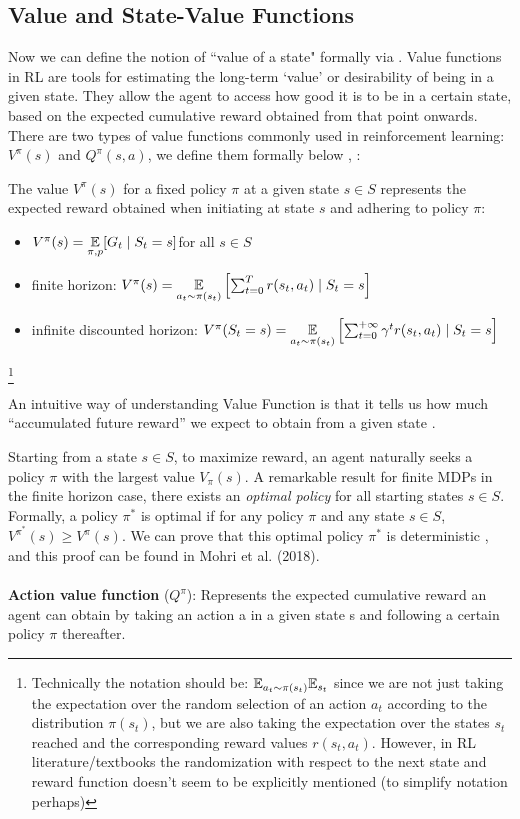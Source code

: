 \subsection{Value and State-Value Functions}

Now we can define the notion of ``value of a state" formally via . Value functions in RL are tools for estimating the long-term `value' or desirability of being in a given state. They allow the agent to access how good it is to be in a certain state, based on the expected cumulative reward obtained from that point onwards. There are two types of value functions commonly used in reinforcement learning: $V^{\pi}(s)$ and $Q^{\pi}(s,a)$, we define them formally below \cite{RL}, \cite{mohri2018}:
\begin{definition}
    The value $V^{\pi}(s)$ for a fixed policy $\pi$ at a given state $s \in S$ represents the expected reward obtained when initiating at state $s$ and adhering to policy $\pi:$
    \begin{itemize}
        \item $V^{\pi}(s) = \underset{\pi, p}{\mathbb E} [G_t \mid S_t = s]$for all $s \in S$ \cite{RL}
        \item finite horizon: $V^{\pi}(s) = \underset{a_t \sim \pi(s_t)}{\mathbb E} \left[ \sum_{t=0}^T r(s_t,a_t) \mid S_t =s
        \right]$ \cite{mohri2018}
        \item infinite discounted horizon: $V^{\pi}(S_t = s) = \underset{a_t \sim \pi(s_t)}{\mathbb E} \left[ \sum_{t=0}^{+ \infty} \gamma^t r(s_t,a_t) \mid S_t =s
        \right]$ \cite{mohri2018}
    \end{itemize}
    \footnote{Technically the notation should be: $\mathbb E_{a_t \sim \pi(s_t)} \mathbb E_{s_t}$ since
    we are not just taking the expectation over the random selection of an action $a_t$ according to the distribution $\pi(s_t)$, but we are also taking the expectation over the states $s_t$ reached and the corresponding reward values $r(s_t, a_t)$. However, in RL literature/textbooks the randomization with respect to the next state and reward function doesn't seem to be  explicitly mentioned (to simplify notation perhaps)} 
\end{definition}
An intuitive way of understanding Value Function is that it tells us how much ``accumulated future reward'' we expect to obtain from a given state .

Starting from a state $s \in S$, to maximize reward, an agent naturally seeks a policy $\pi$ with the largest value $V_{\pi}(s)$. A remarkable result for finite MDPs in the finite horizon case, there exists an \textit{optimal policy} for all starting states $s \in S$. Formally, a policy $\pi^*$ is optimal if for any policy $\pi$ and any state $s \in S$, $V^{\pi^*}(s) \geq  V^{\pi}(s)$. 
We can prove that this optimal policy $\pi^*$ is deterministic \cite{mohri2018}, and this proof can be found in Mohri  et al. (2018). 
\\\
\\
\textbf{Action value function} ($Q^{\pi}$): Represents the expected cumulative reward an agent can obtain by taking an action a in a given state s and following a certain policy $\pi$ thereafter. 

